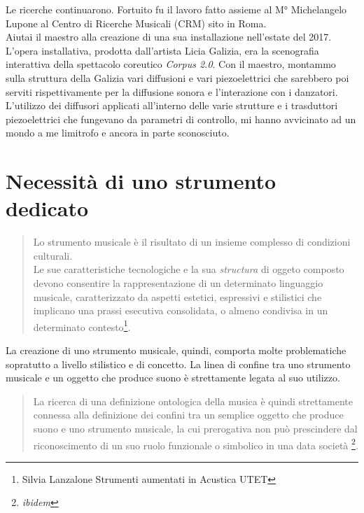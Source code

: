 Le ricerche continuarono. Fortuito fu il lavoro fatto assieme al M° Michelangelo Lupone al Centro di Ricerche Musicali (CRM) sito in Roma. \\
Aiutai il maestro alla creazione di una sua installazione nell'estate del 2017. L'opera installativa, prodotta dall'artista Licia Galizia, era la scenografia interattiva della spettacolo coreutico \textit{Corpus 2.0}. Con il maestro, montammo sulla struttura della Galizia vari diffusioni e vari piezoelettrici che sarebbero poi serviti rispettivamente per la diffusione sonora e l'interazione con i danzatori. L'utilizzo dei diffusori applicati all'interno delle varie strutture e i trasduttori piezoelettrici che fungevano da parametri di controllo, mi hanno avvicinato ad un mondo a me limitrofo e ancora in parte sconosciuto. \\

\section{Necessità di uno strumento dedicato}
\begin{small}
\begin{quotation}
Lo strumento musicale è il risultato di un insieme complesso di condizioni culturali. \\
Le sue caratteristiche tecnologiche e la sua \textit{structura} di oggeto composto devono consentire la rappresentazione di un determinato linguaggio musicale, caratterizzato da aspetti estetici, espressivi e stilistici che implicano una prassi esecutiva consolidata, o almeno condivisa in un determinato contesto\footnote{Silvia Lanzalone Strumenti aumentati in Acustica UTET}.
\end{quotation}
\end{small}
La creazione di uno strumento musicale, quindi, comporta molte problematiche sopratutto a livello stilistico e di concetto. La linea di confine tra uno strumento musicale e un oggetto che produce suono è strettamente legata al suo utilizzo.
\begin{small}
\begin{quotation}
La ricerca di una definizione ontologica della musica è quindi strettamente connessa alla definizione dei confini tra un semplice oggetto che produce suono e uno strumento musicale, la cui prerogativa non può prescindere dal riconoscimento di un suo ruolo funzionale o simbolico in una data società
\footnote{\textit{ibidem}}.
\end{quotation}
\end{small}

